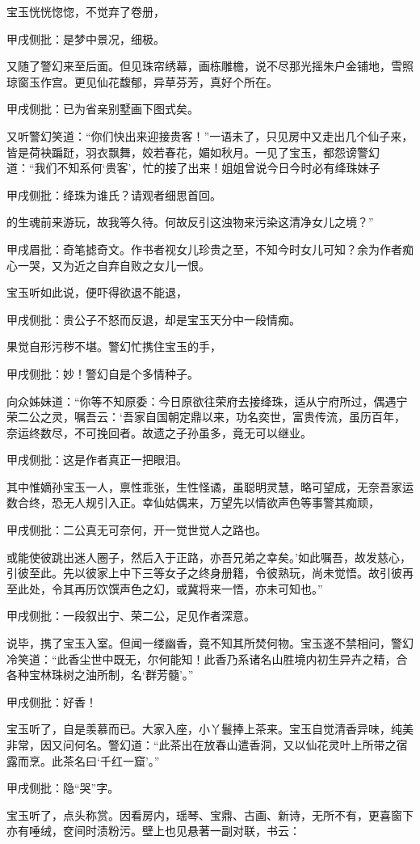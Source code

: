 \begin{parag}
    宝玉恍恍惚惚，不觉弃了卷册，\begin{note}甲戌侧批：是梦中景况，细极。\end{note}又随了警幻来至后面。但见珠帘绣幕，画栋雕檐，说不尽那光摇朱户金铺地，雪照琼窗玉作宫。更见仙花馥郁，异草芬芳，真好个所在。\begin{note}甲戌侧批：已为省亲别墅画下图式矣。\end{note}又听警幻笑道：“你们快出来迎接贵客！”一语未了，只见房中又走出几个仙子来，皆是荷袂蹁跹，羽衣飘舞，姣若春花，媚如秋月。一见了宝玉，都怨谤警幻道：“我们不知系何‘贵客’，忙的接了出来！姐姐曾说今日今时必有绛珠妹子\begin{note}甲戌侧批：绛珠为谁氏？请观者细思首回。\end{note}的生魂前来游玩，故我等久待。何故反引这浊物来污染这清净女儿之境？”\begin{note}甲戌眉批：奇笔摅奇文。作书者视女儿珍贵之至，不知今时女儿可知？余为作者痴心一哭，又为近之自弃自败之女儿一恨。\end{note}宝玉听如此说，便吓得欲退不能退，\begin{note}甲戌侧批：贵公子不怒而反退，却是宝玉天分中一段情痴。\end{note}果觉自形污秽不堪。警幻忙携住宝玉的手，\begin{note}甲戌侧批：妙！警幻自是个多情种子。\end{note}向众姊妹道：“你等不知原委：今日原欲往荣府去接绛珠，适从宁府所过，偶遇宁荣二公之灵，嘱吾云：‘吾家自国朝定鼎以来，功名奕世，富贵传流，虽历百年，奈运终数尽，不可挽回者。故遗之子孙虽多，竟无可以继业。\begin{note}甲戌侧批：这是作者真正一把眼泪。\end{note}其中惟嫡孙宝玉一人，禀性乖张，生性怪谲，虽聪明灵慧，略可望成，无奈吾家运数合终，恐无人规引入正。幸仙姑偶来，万望先以情欲声色等事警其痴顽，\begin{note}甲戌侧批：二公真无可奈何，开一觉世觉人之路也。\end{note}或能使彼跳出迷人圈子，然后入于正路，亦吾兄弟之幸矣。’如此嘱吾，故发慈心，引彼至此。先以彼家上中下三等女子之终身册籍，令彼熟玩，尚未觉悟。故引彼再至此处，令其再历饮馔声色之幻，或冀将来一悟，亦未可知也。”\begin{note}甲戌侧批：一段叙出宁、荣二公，足见作者深意。\end{note}
\end{parag}


\begin{parag}
    说毕，携了宝玉入室。但闻一缕幽香，竟不知其所焚何物。宝玉遂不禁相问，警幻冷笑道：“此香尘世中既无，尔何能知！此香乃系诸名山胜境内初生异卉之精，合各种宝林珠树之油所制，名‘群芳髓’。”\begin{note}甲戌侧批：好香！\end{note}宝玉听了，自是羡慕而已。大家入座，小丫鬟捧上茶来。宝玉自觉清香异味，纯美非常，因又问何名。警幻道：“此茶出在放春山遣香洞，又以仙花灵叶上所带之宿露而烹。此茶名曰‘千红一窟’。”\begin{note}甲戌侧批：隐“哭”字。\end{note}宝玉听了，点头称赏。因看房内，瑶琴、宝鼎、古画、新诗，无所不有，更喜窗下亦有唾绒，奁间时渍粉污。壁上也见悬著一副对联，书云：
\end{parag}


